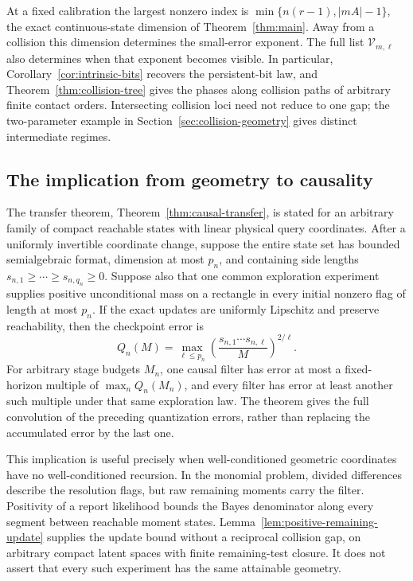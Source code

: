 

At a fixed calibration the largest nonzero index is
$\min\{n(r-1),|mA|-1\}$, the exact continuous-state dimension of
Theorem~\ref{thm:main}. Away from a collision this dimension determines
the small-error exponent. The full list $\mathcal V_{m,\ell}$ also
determines when that exponent becomes visible. In particular,
Corollary~\ref{cor:intrinsic-bits} recovers the persistent-bit law, and
Theorem~\ref{thm:collision-tree} gives the phases along collision paths
of arbitrary finite contact orders. Intersecting collision loci need
not reduce to one gap; the two-parameter example in
Section~\ref{sec:collision-geometry} gives distinct intermediate regimes.

\subsection{The implication from geometry to causality}
The transfer theorem, Theorem~\ref{thm:causal-transfer}, is stated for
an arbitrary family of compact reachable states with linear physical
query coordinates. After a uniformly invertible coordinate change,
suppose the entire state set has bounded semialgebraic format,
dimension at most $p_n$, and containing side lengths
$s_{n,1}\ge\cdots\ge s_{n,q_n}\ge0$. Suppose also that one common
exploration experiment supplies positive unconditional mass on a
rectangle in every initial nonzero flag of length at most $p_n$.
If the exact updates are uniformly Lipschitz and preserve reachability,
then the checkpoint error is
\[
 Q_n(M)=\max_{\ell\le p_n}
       \left(\frac{s_{n,1}\cdots s_{n,\ell}}{M}\right)^{2/\ell}.
\]
For arbitrary stage budgets $M_n$, one causal filter has error at most
a fixed-horizon multiple of $\max_n Q_n(M_n)$, and every filter has
error at least another such multiple under that same exploration law.
The theorem gives the full convolution of the preceding quantization
errors, rather than replacing the accumulated error by the last one.

This implication is useful precisely when well-conditioned geometric
coordinates have no well-conditioned recursion. In the monomial
problem, divided differences describe the resolution flags, but raw
remaining moments carry the filter. Positivity of a report likelihood
bounds the Bayes denominator along every segment between reachable
moment states. Lemma~\ref{lem:positive-remaining-update} supplies the
update bound without a reciprocal collision gap, on arbitrary compact
latent spaces with finite remaining-test closure. It does not assert
that every such experiment has the same attainable geometry.

